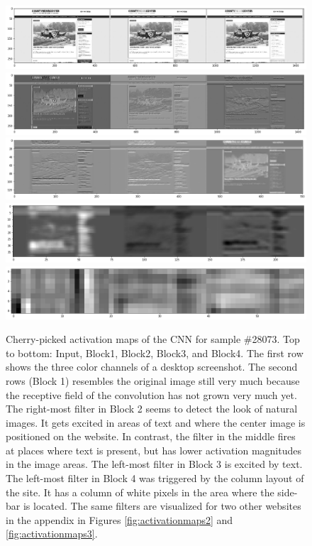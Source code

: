\begin{figure}
    \centering
    \includegraphics[clip,width=\columnwidth]{resources/analysis/feat-map-28073-0.png}\\
    \includegraphics[clip,width=\columnwidth]{resources/analysis/feat-map-28073-1.png}\\
    \includegraphics[clip,width=\columnwidth]{resources/analysis/feat-map-28073-2.png}\\
    \includegraphics[clip,width=\columnwidth]{resources/analysis/feat-map-28073-3.png}\\
    \includegraphics[clip,width=\columnwidth]{resources/analysis/feat-map-28073-4.png}\\
    \caption[Activation maps of the CNN for sample \#28073]{Cherry-picked activation maps of the CNN for sample \#28073. Top to bottom: Input, Block1, Block2, Block3, and Block4. The first row shows the three color channels of a desktop screenshot. The second rows (Block 1) resembles the original image still very much because the receptive field of the convolution has not grown very much yet. The right-most filter in Block 2 seems to detect the look of natural images. It gets excited in areas of text and where the center image is positioned on the website. In contrast, the filter in the middle fires at places where text is present, but has lower activation magnitudes in the image areas. The left-most filter in Block 3 is excited by text. The left-most filter in Block 4 was triggered by the column layout of the site. It has a column of white pixels in the area where the side-bar is located. The same filters are visualized for two other websites in the appendix in Figures \ref{fig:activationmaps2} and \ref{fig:activationmaps3}.}

\end{figure}
